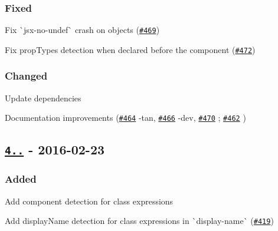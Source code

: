 \subsubsection*{Fixed}


\begin{DoxyItemize}
\item Fix \`{}jsx-\/no-\/undef\`{} crash on objects (\href{https://github.com/yannickcr/eslint-plugin-react/issues/469}{\tt \#469})
\item Fix prop\+Types detection when declared before the component (\href{https://github.com/yannickcr/eslint-plugin-react/issues/472}{\tt \#472})
\end{DoxyItemize}

\subsubsection*{Changed}


\begin{DoxyItemize}
\item Update dependencies
\item Documentation improvements (\href{https://github.com/yannickcr/eslint-plugin-react/pull/464}{\tt \#464} -\/tan, \href{https://github.com/yannickcr/eslint-plugin-react/pull/466}{\tt \#466} -\/dev, \href{https://github.com/yannickcr/eslint-plugin-react/pull/470}{\tt \#470} ; \href{https://github.com/yannickcr/eslint-plugin-react/pull/462}{\tt \#462} )
\end{DoxyItemize}

\subsection*{\href{https://github.com/yannickcr/eslint-plugin-react/compare/v4.0.0...v4.1.0}{\tt 4..} -\/ 2016-\/02-\/23}

\subsubsection*{Added}


\begin{DoxyItemize}
\item Add component detection for class expressions
\item Add display\+Name detection for class expressions in \`{}display-\/name\`{} (\href{https://github.com/yannickcr/eslint-plugin-react/issues/419}{\tt \#419})
\end{DoxyItemize}

